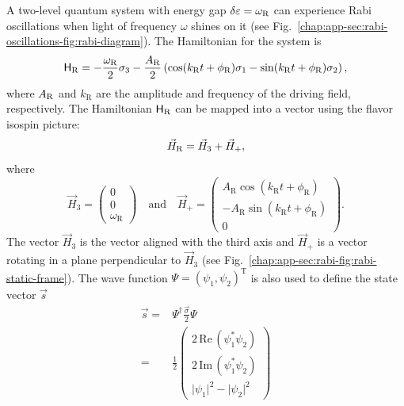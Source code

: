 A two-level quantum system with energy gap $\delta\varepsilon = \omega_{\mathrm R}$ can experience Rabi oscillations when light of frequency $\omega$ shines on it (see Fig.~\ref{chap:app-sec:rabi-oscillations-fig:rabi-diagram}).
The Hamiltonian for the system is
\begin{equation}
    \mathsf H_{\RR} = -\frac{\omega_{\RR}}{2}\sigma_3 - \frac{A_{\RR} }{2}  \left( \cos(k_{\RR} t +\phi_{\RR})\sigma_1  - \sin(k_{\RR} t +\phi_{\RR}) \sigma_2\right),
    \label{rabi-oscillation-single-perturbation}
\end{equation}
where $A_{\mathrm R}$ and $k_{\mathrm{R}}$ are the amplitude and frequency of the driving field, respectively. The Hamiltonian $\mathsf H_\mathrm R$ can be mapped into a vector using the flavor isospin picture:
\begin{equation*}
\vec H_{\RR} = \vec H_3 + \vec H_+,
\label{chap:matter-eqn:rabi-hamiltonian-h3-hplus}
\end{equation*}
where
\begin{equation}
    \vec{H}_3 =  \begin{pmatrix}
    0 \\ 0 \\ \omega_{\mathrm R}
    \end{pmatrix} \quad \text{and} \quad
    \vec{H}_+ =  \begin{pmatrix}
    A_{\mathrm{R}} \cos(k_{\mathrm{R}} t +\phi_{\mathrm{R}}) \\
    - A_{\mathrm{R}} \sin(k_{\mathrm{R}} t +\phi_{\mathrm{R}}) \\
    0
    \end{pmatrix}.
    \label{chap:app-sec:rabi-eqn:h3-and-hplus}
\end{equation}
The vector $\vec{H}_3$ is the vector aligned with the third axis and $\vec{H}_+$ is a vector rotating in a plane perpendicular to $\vec{H}_3$ (see Fig.~\ref{chap:app-sec:rabi-fig:rabi-static-frame}). The wave function $\Psi=(\psi_1,\psi_2)^{\mathrm{T}}$ is also used to define the state vector $\vec{s}$
\begin{align}
    \vec{s} =& \Psi^\dagger \frac{\vec{\sigma}}{2}\Psi \\
    =& \frac{1}{2}\begin{pmatrix}
    2\,\mathrm{Re}\,(\psi_1^* \psi_2) \\
    2\,\mathrm{Im}\,(\psi_1^*\psi_2) \\
    \lvert \psi_1 \rvert^2 - \lvert \psi_2 \rvert^2
    \end{pmatrix}
\end{align}



